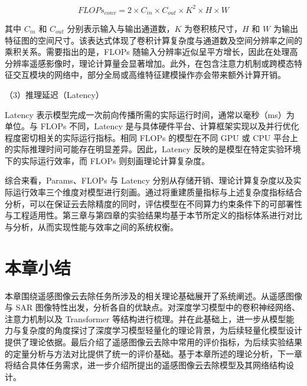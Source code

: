 \begin{equation}
{FLOPs}_{conv} = 2 \times C_{in} \times C_{out} \times K^2 \times H \times W
\end{equation}

其中 $C_{in}$ 和 $C_{out}$ 分别表示输入与输出通道数，$K$ 为卷积核尺寸，$H$ 和 $W$ 为输出特征图的空间尺寸。该表达式体现了卷积计算复杂度与通道数及空间分辨率之间的乘积关系。需要指出的是，FLOPs 随输入分辨率近似呈平方增长，因此在处理高分辨率遥感影像时，理论计算量会显著增加。此外，在包含注意力机制或跨模态特征交互模块的网络中，部分全局或高维特征建模操作亦会带来额外计算开销。

（3）推理延迟（Latency）

Latency 表示模型完成一次前向传播所需的实际运行时间，通常以毫秒（ms）为单位。与 FLOPs 不同，Latency 是与具体硬件平台、计算框架实现以及并行优化程度密切相关的实际运行指标。相同 FLOPs 的模型在不同 GPU 或 CPU 平台上的实际推理时间可能存在明显差异。因此，Latency 反映的是模型在特定实验环境下的实际运行效率，而 FLOPs 则刻画理论计算复杂度。

综合来看，Params、FLOPs 与 Latency 分别从存储开销、理论计算复杂度以及实际运行效率三个维度对模型进行刻画。通过将重建质量指标与上述复杂度指标结合分析，可以在保证云去除精度的同时，评估模型在不同算力约束条件下的可部署性与工程适用性。第三章与第四章的实验结果均基于本节所定义的指标体系进行对比与分析，从而实现性能与效率之间的系统权衡。

\section{本章小结}

本章围绕遥感图像云去除任务所涉及的相关理论基础展开了系统阐述。从遥感图像与 SAR 图像特性出发，分析各自的优缺点。对深度学习模型中的卷积神经网络、注意力机制以及 Transformer 等结构进行梳理。并在此基础上，进一步从模型能力与复杂度的角度探讨了深度学习模型轻量化的理论背景，为后续轻量化模型设计提供了理论依据。最后介绍了遥感图像云去除中常用的评价指标，为后续实验结果的定量分析与方法对比提供了统一的评价基础。基于本章所述的理论分析，下一章将结合具体任务需求，进一步介绍所提出的遥感图像云去除模型及其网络结构设计。









